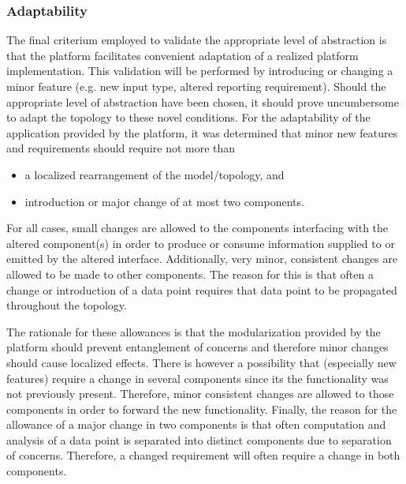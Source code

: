 \subsubsection{Adaptability}
The final criterium employed to validate the appropriate level of abstraction is that the platform facilitates convenient adaptation of a realized platform implementation. This validation will be performed by introducing or changing a minor feature (e.g. new input type, altered reporting requirement). Should the appropriate level of abstraction have been chosen, it should prove uncumbersome to adapt the topology to these novel conditions. For the adaptability of the application provided by the platform, it was determined that minor new features and requirements should require not more than
\begin{itemize}
\nospace
\item a localized rearrangement of the model/topology, and
\item introduction or major change of at most two components.
\end{itemize}
For all cases, small changes are allowed to the components interfacing with the altered component(s) in order to produce or consume information supplied to or emitted by the altered interface. Additionally, very minor, consistent changes are allowed to be made to other components. The reason for this is that often a change or introduction of a data point requires that data point to be propagated throughout the topology.

The rationale for these allowances is that the modularization provided by the platform should prevent entanglement of concerns and therefore minor changes should cause localized effects. There is however a possibility that (especially new features) require a change in several components since its the functionality was not previously present. Therefore, minor consistent changes are allowed to those components in order to forward the new functionality. Finally, the reason for the allowance of a major change in two components is that often computation and analysis of a data point is separated into distinct components due to separation of concerns. Therefore, a changed requirement will often require a change in both components.


